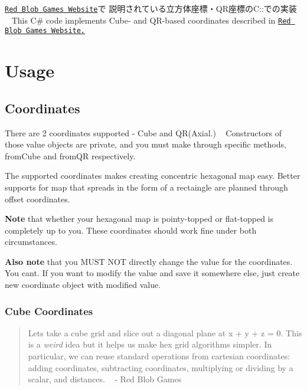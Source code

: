 \href{https://www.redblobgames.com/grids/hexagons/}{\tt Red Blob Games Website}で 説明されている立方体座標・\+Q\+R座標の\+C\+::での実装 ~\newline
This C\# code implements Cube-\/ and Q\+R-\/based coordinates described in \href{https://www.redblobgames.com/grids/hexagons/}{\tt Red Blob Games Website.}

\section*{Usage}

\subsection*{Coordinates}

There are 2 coordinates supported -\/ Cube and QR(Axial.) ~\newline
Constructors of those value objects are private, and you must make through specific methods, {\ttfamily from\+Cube} and {\ttfamily from\+QR} respectively.

The supported coordinates makes creating concentric hexagonal map easy. Better supports for map that spreads in the form of a rectaingle are planned through offset coordinates.

{\bfseries Note} that whether your hexagonal map is pointy-\/topped or flat-\/topped is completely up to you. These coordinates should work fine under both circumstances.

{\bfseries Also note} that you M\+U\+ST N\+OT directly change the value for the coordinates. You can\textquotesingle{}t. If you want to modify the value and save it somewhere else, just create new coordinate object with modified value.

\subsubsection*{Cube Coordinates}

\begin{quote}
Let\textquotesingle{}s take a cube grid and slice out a diagonal plane at {\ttfamily x + y + z = 0.} This is a {\itshape weird} idea but it helps us make hex grid algorithms simpler. In particular, we can reuse standard operations from cartesian coordinates\+: adding coordinates, subtracting coordinates, multiplying or dividing by a scalar, and distances. ~\newline
 -\/ Red Blob Games \end{quote}


